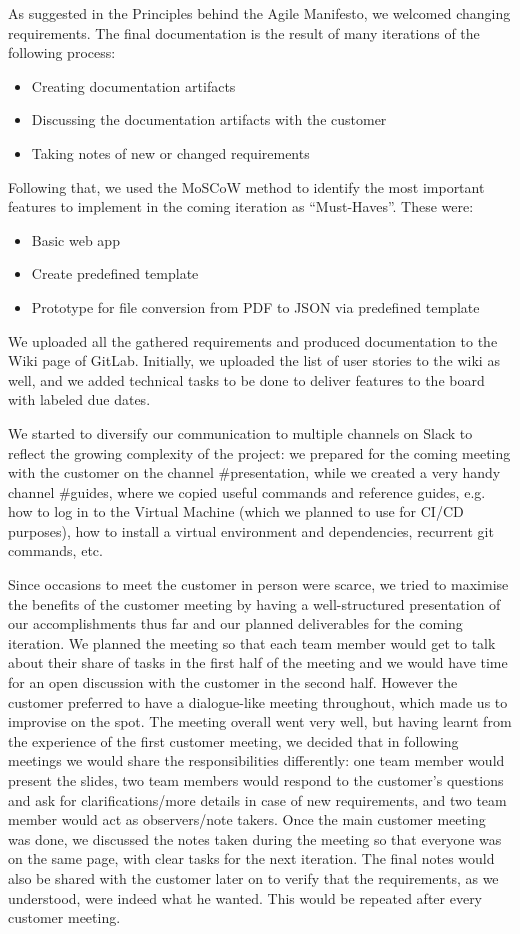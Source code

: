 \documentclass{l3proj}
\begin{document}
As suggested in the Principles behind the Agile Manifesto, we welcomed changing requirements.
The final documentation is the result of many iterations of the following process:
\begin{itemize}
\item Creating documentation artifacts
\item Discussing the documentation artifacts with the customer
\item Taking notes of new or changed requirements
\end{itemize}

Following that, we used the MoSCoW method to identify the most important features to implement in the coming iteration as ``Must-Haves''. These were: 
\begin{itemize}
\item Basic web app
\item Create predefined template
\item Prototype for file conversion from PDF to JSON via predefined template
\end{itemize}

We uploaded all the gathered requirements and produced documentation to the Wiki page of GitLab.  Initially, we uploaded the list of user stories to the wiki as well, and we added technical tasks to be done to deliver features to the board with labeled due dates.

We started to diversify our communication to multiple channels on Slack to reflect the growing complexity of the project: we prepared for the coming meeting with the customer on the channel \#presentation, while we created a very handy channel \#guides, where we copied useful commands and reference guides, e.g. how to log in to the Virtual Machine (which we planned to use for CI/CD purposes), how to install a virtual environment and dependencies, recurrent git commands, etc.

Since occasions to meet the customer in person were scarce, we tried to maximise the benefits of the customer meeting by having a well-structured presentation of our accomplishments thus far and our planned deliverables for the coming iteration. We planned the meeting so that each team member would get to talk about their share of tasks in the first half of the meeting and we would have time for an open discussion with the customer in the second half. However the customer preferred to have a dialogue-like meeting throughout, which made us to improvise on the spot. The meeting overall went very well, but having learnt from the experience of the first customer meeting, we decided that in following meetings we would share the responsibilities differently: one team member would present the slides, two team members would respond to the customer’s questions and ask for clarifications/more details in case of new requirements, and two team member would act as observers/note takers. Once the main customer meeting was done, we discussed the notes taken during the meeting so that everyone was on the same page, with clear tasks for the next iteration. The final notes would also be shared with the customer later on to verify that the requirements, as we understood, were indeed what he wanted. This would be repeated after every customer meeting.
\end{document}
